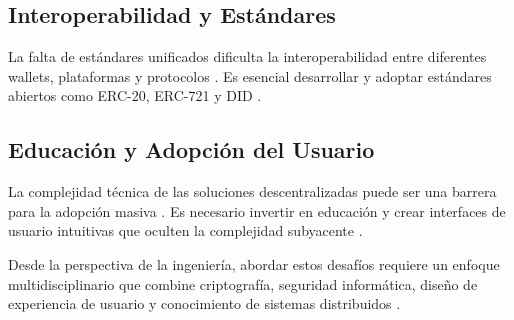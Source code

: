 \subsection{Interoperabilidad y Estándares}

La falta de estándares unificados dificulta la interoperabilidad entre diferentes wallets, plataformas y protocolos \cite{hardjono2019blockchain}. Es esencial desarrollar y adoptar estándares abiertos como ERC-20, ERC-721 y DID \cite{eip20, eip721, w3cdid}.

\subsection{Educación y Adopción del Usuario}

La complejidad técnica de las soluciones descentralizadas puede ser una barrera para la adopción masiva \cite{parizi2018empirical}. Es necesario invertir en educación y crear interfaces de usuario intuitivas que oculten la complejidad subyacente \cite{robinson2019user}.

Desde la perspectiva de la ingeniería, abordar estos desafíos requiere un enfoque multidisciplinario que combine criptografía, seguridad informática, diseño de experiencia de usuario y conocimiento de sistemas distribuidos \cite{tschorsch2016bitcoin}.

